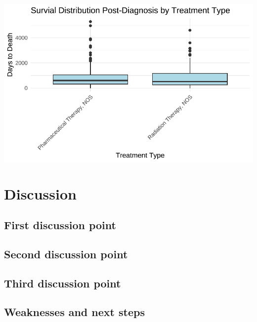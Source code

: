 \documentclass[
  letterpaper,
  DIV=11,
  numbers=noendperiod]{scrartcl}
\begin{document}
\includegraphics{paper_files/figure-pdf/unnamed-chunk-4-17.pdf}

\begin{table}

\end{table}

\hypertarget{sec-discussion}{%
\section{Discussion}\label{sec-discussion}}

\hypertarget{sec-first-point}{%
\subsection{First discussion point}\label{sec-first-point}}

\hypertarget{second-discussion-point}{%
\subsection{Second discussion point}\label{second-discussion-point}}

\hypertarget{third-discussion-point}{%
\subsection{Third discussion point}\label{third-discussion-point}}

\hypertarget{weaknesses-and-next-steps}{%
\subsection{Weaknesses and next steps}\label{weaknesses-and-next-steps}}

\newpage
\end{document}
